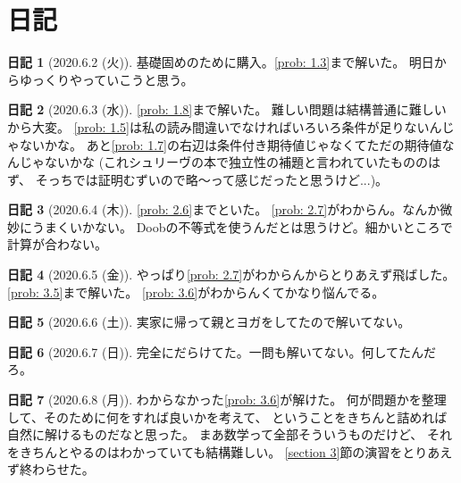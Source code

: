 \documentclass[uplatex]{jsarticle}
\theoremstyle{definition}
\newtheorem*{nikki*}{日記}
\begin{document}
\newpage
\appendix

\section{日記}

\begin{nikki*}[2020.6.2 (火)]
  基礎固めのために購入。\autoref{prob: 1.3}まで解いた。
  明日からゆっくりやっていこうと思う。
\end{nikki*}

\begin{nikki*}[2020.6.3 (水)]
  \autoref{prob: 1.8}まで解いた。
  難しい問題は結構普通に難しいから大変。
  \autoref{prob: 1.5}は私の読み間違いでなければいろいろ条件が足りないんじゃないかな。
  あと\autoref{prob: 1.7}の右辺は条件付き期待値じゃなくてただの期待値なんじゃないかな
  (これシュリーヴの本で独立性の補題と言われていたもののはず、
  そっちでは証明むずいので略〜って感じだったと思うけど...)。
\end{nikki*}

\begin{nikki*}[2020.6.4 (木)]
  \autoref{prob: 2.6}までといた。
  \autoref{prob: 2.7}がわからん。なんか微妙にうまくいかない。
  Doobの不等式を使うんだとは思うけど。細かいところで計算が合わない。
\end{nikki*}

\begin{nikki*}[2020.6.5 (金)]
  やっぱり\autoref{prob: 2.7}がわからんからとりあえず飛ばした。
  \autoref{prob: 3.5}まで解いた。
  \autoref{prob: 3.6}がわからんくてかなり悩んでる。
\end{nikki*}

\begin{nikki*}[2020.6.6 (土)]
  実家に帰って親とヨガをしてたので解いてない。
\end{nikki*}

\begin{nikki*}[2020.6.7 (日)]
  完全にだらけてた。一問も解いてない。何してたんだろ。
\end{nikki*}

\begin{nikki*}[2020.6.8 (月)]
  わからなかった\autoref{prob: 3.6}が解けた。
  何が問題かを整理して、そのために何をすれば良いかを考えて、
  ということをきちんと詰めれば自然に解けるものだなと思った。
  まあ数学って全部そういうものだけど、
  それをきちんとやるのはわかっていても結構難しい。
  \ref{section 3}節の演習をとりあえず終わらせた。
\end{nikki*}
\end{document}
